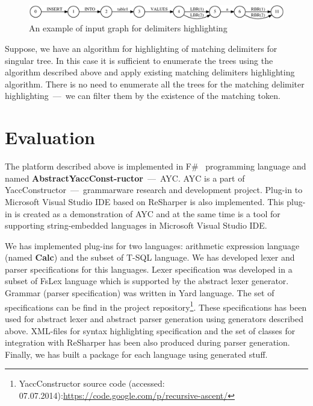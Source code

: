 \documentclass{acm_proc_article-sp}
\begin{document}
\begin{figure}
    \begin{center}
        \includegraphics[scale=0.5]{graphs/insert_input.eps}
    \end{center}
    \caption{An example of input graph for delimiters highlighting}
    \label{insert_input}
\end{figure}

Suppose, we have an algorithm for highlighting of matching delimiters for singular tree. In this case it is sufficient to enumerate the trees using the algorithm described above and apply existing matching delimiters highlighting algorithm. There is no need to enumerate all the trees for the matching delimiter highlighting~---~we can filter them by the existence of the matching token.

\section{Evaluation}

The platform described above is implemented in F\#~\cite{FS} programming language and named {\bf AbstractYaccConst-ructor}~---~AYC.  AYC is a part of YaccConstructor~---~grammarware research and development project. Plug-in to Microsoft Visual Studio IDE based on ReSharper is also implemented. This plug-in is created as a demonstration of AYC and at the same time is a tool for supporting string-embedded languages in Microsoft Visual Studio IDE.

We has implemented plug-ins for two languages: arithmetic expression language (named {\bf Calc}) and the subset of T-SQL language. We has developed lexer and parser specifications for this languages. Lexer specification was developed in a subset of FsLex language which is supported by the abstract lexer generator. Grammar (parser specification) was written in Yard language. The set of specifications can be find in the project repository\footnote{YaccConstructor source code  (accessed: 07.07.2014):\url{https://code.google.com/p/recursive-ascent/}}. These specifications has been used for abstract lexer and abstract parser generation using generators described above. XML-files for syntax highlighting specification and the set of classes for integration with ReSharper has been also produced during parser generation. Finally, we has built a package for each language using generated stuff. 
\end{document}
